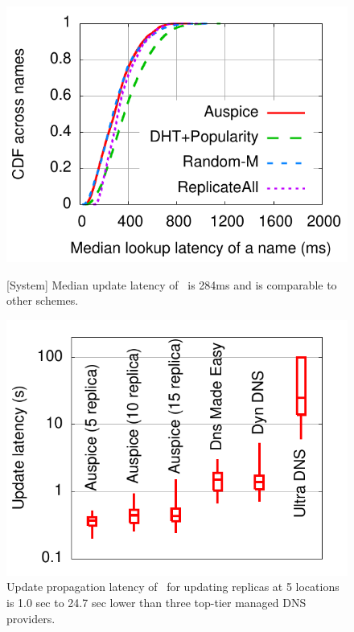 \begin{figure}[ht]
\vspace{0.05in}
\begin{minipage}[b]{0.3\linewidth}
\centering
\includegraphics[scale=0.55]{auspice/graph/newgraphs/update-latency-cdf.pdf}
\caption{[System] Median update latency of \auspice\ is 284ms and is comparable to other schemes.} 
\label{fig:updates}
\end{minipage}
\hspace{0.3cm}
\begin{minipage}[b]{0.35\linewidth}
\centering
\includegraphics[scale=0.55]{auspice/graph/newgraphs/managed-update.pdf}
\caption{Update propagation latency of \auspice\ for updating replicas at 5 locations is  1.0 sec to 24.7 sec lower than three top-tier managed DNS providers. }

\end{minipage}
\end{figure}
